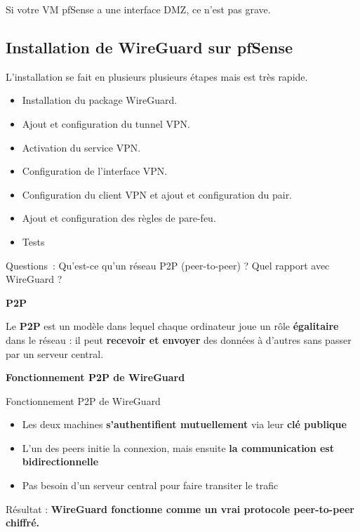 \noindent Si votre VM pfSense a une interface DMZ, ce n'est pas grave.

\subsection*{Installation de WireGuard sur pfSense}
{}

\noindent L'installation se fait en plusieurs plusieurs étapes mais est très rapide.
\begin{itemize}
  \item Installation du package WireGuard.
  \item Ajout et configuration du tunnel VPN.
  \item Activation du service VPN.
  \item Configuration de l'interface VPN.
  \item Configuration du client VPN et ajout et configuration du pair.
  \item Ajout et configuration des règles de pare-feu.
  \item Tests
\end{itemize}

\vspace{0.5cm}

Questions~: Qu'est-ce qu'un réseau P2P (peer-to-peer) ? Quel rapport avec WireGuard ?

\vspace{0.5cm}

\noindent \textbf{P2P}

\noindent Le \textbf{P2P} est un modèle dans lequel chaque ordinateur joue un rôle \textbf{égalitaire} dans le réseau : il peut \textbf{recevoir et envoyer} des données à d’autres sans passer par un serveur central.

\vspace{0.5cm}

\noindent \textbf{Fonctionnement P2P de WireGuard}

\noindent Fonctionnement P2P de WireGuard

\begin{itemize}
  \item Les deux machines \textbf{s'authentifient mutuellement} via leur \textbf{clé publique}
  \item L’un des peers initie la connexion, mais ensuite \textbf{la communication est bidirectionnelle}
  \item Pas besoin d’un serveur central pour faire transiter le trafic
\end{itemize}
\noindent Résultat : \textbf{WireGuard fonctionne comme un vrai protocole peer-to-peer chiffré.}

